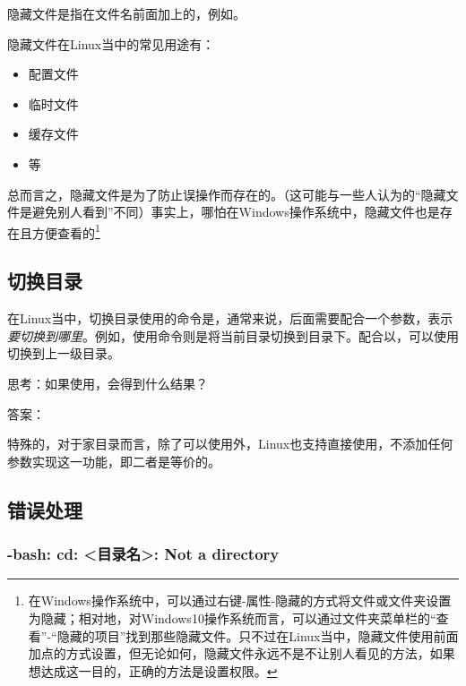\begin{extend}
    隐藏文件是指在文件名前面加上的，例如。

    隐藏文件在Linux当中的常见用途有：
    \begin{itemize}
        \item 配置文件
        \item 临时文件
        \item 缓存文件
        \item 等
    \end{itemize}

    总而言之，隐藏文件是为了防止误操作而存在的。（这可能与一些人认为的“隐藏文件是避免别人看到”不同）事实上，哪怕在Windows操作系统中，隐藏文件也是存在且方便查看的\footnote{在Windows操作系统中，可以通过右键-属性-隐藏的方式将文件或文件夹设置为隐藏；相对地，对Windows10操作系统而言，可以通过文件夹菜单栏的“查看”-“隐藏的项目”找到那些隐藏文件。只不过在Linux当中，隐藏文件使用前面加点的方式设置，但无论如何，隐藏文件永远不是不让别人看见的方法，如果想达成这一目的，正确的方法是设置权限。}
\end{extend}

\subsection{切换目录}\label{subsec:目录操作-切换目录}

在Linux当中，切换目录使用的命令是，通常来说，后面需要配合一个参数，表示\emph{要切换到哪里}。例如，使用命令则是将当前目录切换到目录下。配合以，可以使用切换到上一级目录。

思考：如果使用，会得到什么结果？

答案：

特殊的，对于家目录而言，除了可以使用外，Linux也支持直接使用，不添加任何参数实现这一功能，即二者是等价的。

\subsection{错误处理}\label{subsec:目录操作-错误处理}

\subsubsection{-bash: cd: <目录名>: Not a directory}

